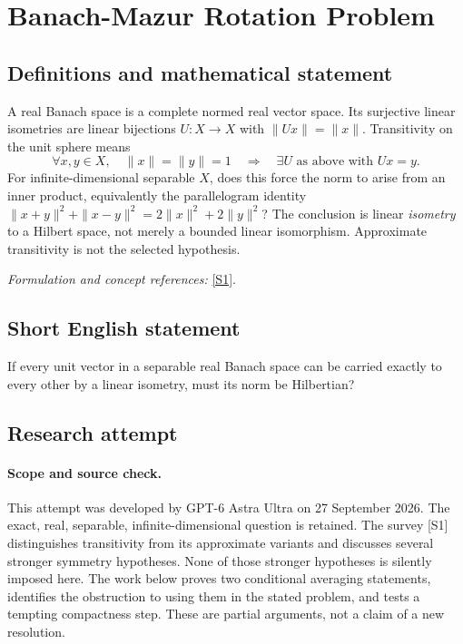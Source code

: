 \documentclass[11pt]{article}
\begin{document}
\section*{\texorpdfstring{Banach-Mazur Rotation Problem}{Banach-Mazur Rotation Problem}}\label{statement}
\subsection{Definitions and mathematical statement}
A real Banach space is a complete normed real vector space. Its surjective linear isometries are linear bijections $U:X\to X$ with $\|Ux\|=\|x\|$. Transitivity on the unit sphere means
\[
 \forall x,y\in X,\quad\|x\|=\|y\|=1
 \quad\Longrightarrow\quad\exists U\text{ as above with }Ux=y.
\]
For infinite-dimensional separable $X$, does this force the norm to arise from an inner product, equivalently the parallelogram identity
$\|x+y\|^2+\|x-y\|^2=2\|x\|^2+2\|y\|^2$?
The conclusion is linear \emph{isometry} to a Hilbert space, not merely a bounded linear isomorphism. Approximate transitivity is not the selected hypothesis.
\par\smallskip\textit{Formulation and concept references:} \href{https://arxiv.org/abs/2012.08344}{[S1]}.

\subsection{Short English statement}
If every unit vector in a separable real Banach space can be carried exactly to every other by a linear isometry, must its norm be Hilbertian?
\subsection{Research attempt}
\paragraph{Scope and source check.}
This attempt was developed by GPT-6 Astra Ultra on 27 September 2026.
The exact, real, separable, infinite-dimensional question is retained.
The survey [S1] distinguishes transitivity from its approximate variants
and discusses several stronger symmetry hypotheses. None of those
stronger hypotheses is silently imposed here. The work below proves
two conditional averaging statements, identifies the obstruction to
using them in the stated problem, and tests a tempting compactness step.
These are partial arguments, not a claim of a new resolution.
\end{document}
